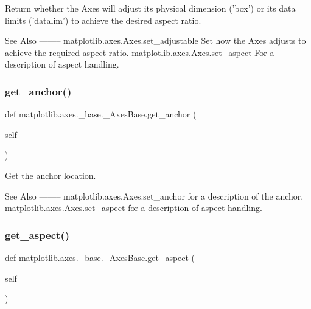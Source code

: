 \begin{DoxyVerb}Return whether the Axes will adjust its physical dimension ('box') or
its data limits ('datalim') to achieve the desired aspect ratio.

See Also
--------
matplotlib.axes.Axes.set_adjustable
    Set how the Axes adjusts to achieve the required aspect ratio.
matplotlib.axes.Axes.set_aspect
    For a description of aspect handling.
\end{DoxyVerb}
 \mbox{\label{classmatplotlib_1_1axes_1_1__base_1_1__AxesBase_af71743e45c8fba195fa7b3c85e6457e4}} 
\subsubsection{\texorpdfstring{get\+\_\+anchor()}{get\_anchor()}}
{\footnotesize\ttfamily def matplotlib.\+axes.\+\_\+base.\+\_\+\+Axes\+Base.\+get\+\_\+anchor (\begin{DoxyParamCaption}\item[{}]{self }\end{DoxyParamCaption})}

\begin{DoxyVerb}Get the anchor location.

See Also
--------
matplotlib.axes.Axes.set_anchor
    for a description of the anchor.
matplotlib.axes.Axes.set_aspect
    for a description of aspect handling.
\end{DoxyVerb}
 \mbox{\label{classmatplotlib_1_1axes_1_1__base_1_1__AxesBase_ae9d1763aa72778abe0791b26b1091f08}} 
\subsubsection{\texorpdfstring{get\+\_\+aspect()}{get\_aspect()}}
{\footnotesize\ttfamily def matplotlib.\+axes.\+\_\+base.\+\_\+\+Axes\+Base.\+get\+\_\+aspect (\begin{DoxyParamCaption}\item[{}]{self }\end{DoxyParamCaption})}

